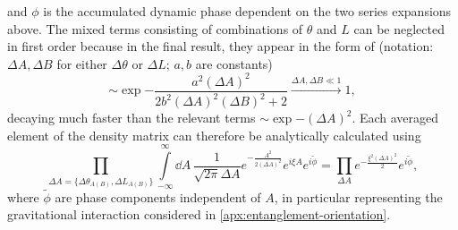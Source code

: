 and $\phi$ is the accumulated dynamic phase dependent on the two series expansions above.
The mixed terms consisting of combinations of $\theta$ and $L$ can be neglected in first order because in the final result, they appear in the form of (notation: $\Delta A,\Delta B$ for either $\Delta\theta$ or $\Delta L$; $a,b$ are constants)
\begin{equation}
  \sim \exp{-\frac{a^2(\Delta A)^2}{2b^2(\Delta A)^2(\Delta B)^2 + 2}} \xrightarrow{\Delta A,\Delta B \ll 1} 1 ,
\end{equation}
decaying much faster than the relevant terms $\sim \exp{-(\Delta A)^2}$.
Each averaged element of the density matrix can therefore be analytically calculated using 
\begin{equation}
  \prod_{\Delta A = \{\Delta \theta_{A(B)}, \Delta L_{A(B)}\}} \int\limits_{-\infty}^{\infty} \dd A \, \frac{1}{\sqrt{2\pi}\Delta A} e^{-\frac{A^2}{2 (\Delta A)^2}} e^{i\xi A} e^{i\tilde{\phi}} = \prod_{\Delta A} e^{-\frac{\xi^2 (\Delta A)^2}{2}} e^{i\tilde{\phi}} ,
\end{equation}
where $\tilde{\phi}$ are phase components independent of $A$, in particular representing the gravitational interaction considered in \cref{apx:entanglement-orientation}.

